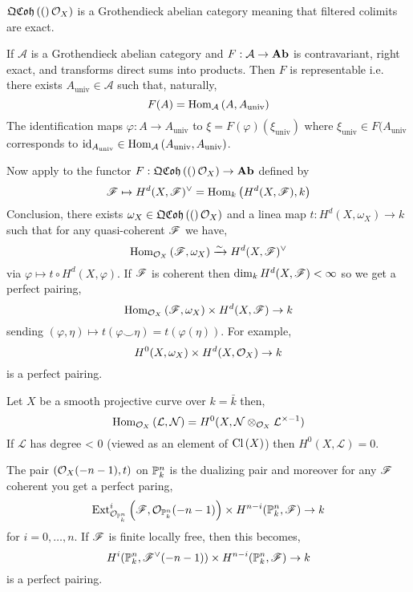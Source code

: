 \documentclass[12pt]{article}
\begin{document}
\begin{theorem}
$\QCoh(\struct{X})$ is a Grothendieck abelian category meaning that filtered colimits are exact.
\end{theorem}

\begin{theorem}
If $\mathcal{A}$ is a Grothendieck abelian category and $F : \mathcal{A} \to \Ab$ is contravariant, right exact, and transforms direct sums into products. Then $F$ is representable i.e. there exists $A_{\text{univ}} \in \mathcal{A}$ such that, naturally,
\[ F(A) = \Homover{\mathcal{A}}{A}{A_{\text{univ}}} \]
The identification maps $\varphi : A \to A_{\text{univ}}$ to $\xi = F(\varphi)(\xi_{\text{univ}})$ where $\xi_{\text{univ}} \in F(A_{\text{univ}}$ corresponds to $\id_{A_{\text{univ}}} \in \Homover{\mathcal{A}}{A_{\text{univ}}}{A_{\text{univ}}}$.
\end{theorem}

Now apply to the functor $F : \QCoh(\struct{X}) \to \Ab$ defined by 
\[ \F \mapsto H^d(X, \F)^\vee = \Homover{k}{H^d(X,\F)}{k} \]
Conclusion, there exists $\omega_X \in \QCoh(\struct{X})$ and a linea map $t : H^d(X, \omega_X) \to k$ such that for any quasi-coherent $\F$ we have,
\[ \Homover{\struct{X}}{\F}{\omega_X} \xrightarrow{\sim} H^d(X, \F)^\vee \]
via $\varphi \mapsto t \circ H^d(X, \varphi)$. If $\F$ is coherent then $\dim_k H^d(X, \F) < \infty$ so we get a perfect pairing,
\[ \Homover{\struct{X}}{\F}{\omega_X} \times H^d(X, \F) \to k \]
sending $(\varphi, \eta) \mapsto t(\varphi \smile \eta) = t(\varphi(\eta))$.
For example,
\[ H^0(X, \omega_X) \times H^d(X, \struct{X}) \to k \]
is a perfect pairing. 

\begin{theorem}
Let $X$ be a smooth projective curve over $k = \bar{k}$ then,
\[ \Homover{\struct{X}}{\mathcal{L}}{\mathcal{N}} = H^0(X, \mathcal{N} \otimes_{\struct{X}} \mathcal{L}^{\times - 1}) \]
If $\mathcal{L}$ has degree < 0 (viewed as an element of $\Cl{X}$) then $H^0(X, \mathcal{L}) = 0$.
\end{theorem}

\begin{theorem}
The pair $(\struct{X}(-n-1), t)$ on $\P^n_k$ is the dualizing pair and moreover for any $\F$ coherent you get a perfect paring,
\[ \Ext{i}{\struct{\P^n_k}}{\F}{\struct{\P^n_k}(-n-1)} \times H^{n-i}(\P^n_k, \F) \to k \]
for $i = 0, \dots, n$. If $\F$ is finite locally free, then this becomes,
\[ H^i(\P_k^n, \F^\vee(-n-1)) \times H^{n-i}(\P^n_k, \F) \to k \]
is a perfect pairing.
\end{theorem}
\end{document}
